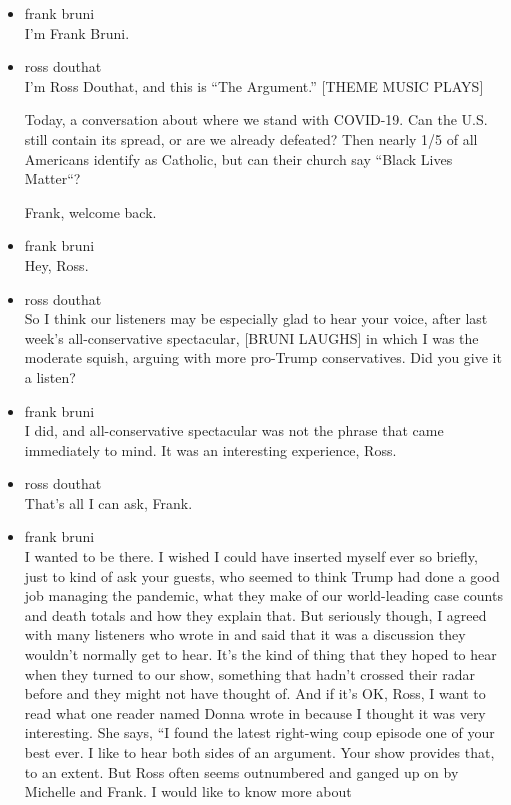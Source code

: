 \begin{itemize}
\item
  frank bruni\\
  I'm Frank Bruni.
\item
  ross douthat\\
  I'm Ross Douthat, and this is ``The Argument.'' {[}THEME MUSIC
  PLAYS{]}

  Today, a conversation about where we stand with COVID-19. Can the U.S.
  still contain its spread, or are we already defeated? Then nearly 1/5
  of all Americans identify as Catholic, but can their church say
  ``Black Lives Matter``?

  Frank, welcome back.
\item
  frank bruni\\
  Hey, Ross.
\item
  ross douthat\\
  So I think our listeners may be especially glad to hear your voice,
  after last week's all-conservative spectacular, {[}BRUNI LAUGHS{]} in
  which I was the moderate squish, arguing with more pro-Trump
  conservatives. Did you give it a listen?
\item
  frank bruni\\
  I did, and all-conservative spectacular was not the phrase that came
  immediately to mind. It was an interesting experience, Ross.
\item
  ross douthat\\
  That's all I can ask, Frank.
\item
  frank bruni\\
  I wanted to be there. I wished I could have inserted myself ever so
  briefly, just to kind of ask your guests, who seemed to think Trump
  had done a good job managing the pandemic, what they make of our
  world-leading case counts and death totals and how they explain that.
  But seriously though, I agreed with many listeners who wrote in and
  said that it was a discussion they wouldn't normally get to hear. It's
  the kind of thing that they hoped to hear when they turned to our
  show, something that hadn't crossed their radar before and they might
  not have thought of. And if it's OK, Ross, I want to read what one
  reader named Donna wrote in because I thought it was very interesting.
  She says, ``I found the latest right-wing coup episode one of your
  best ever. I like to hear both sides of an argument. Your show
  provides that, to an extent. But Ross often seems outnumbered and
  ganged up on by Michelle and Frank. I would like to know more about

\end{itemize}
